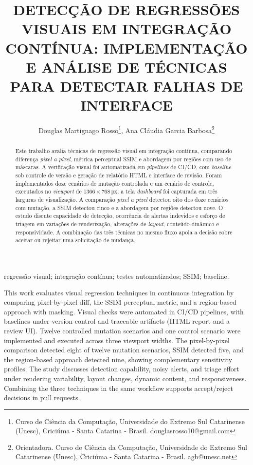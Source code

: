 \documentclass{UNESC}
\title{DETECÇÃO DE REGRESSÕES VISUAIS EM INTEGRAÇÃO CONTÍNUA: IMPLEMENTAÇÃO E ANÁLISE DE TÉCNICAS PARA DETECTAR FALHAS DE INTERFACE}
\author
{
   Douglas Martignago Rosso\footnote{Curso de Ciência da Computação, Universidade do Extremo Sul Catarinense (Unesc), Criciúma - Santa Catarina - Brasil. douglasrosso10@gmail.com},
   Ana Cláudia Garcia Barbosa\footnote{Orientadora. Curso de Ciência da Computação, Universidade do Extremo Sul Catarinense (Unesc), Criciúma - Santa Catarina - Brasil. agb@unesc.net}
}
\begin{document}
\onehalfspacing

\maketitle

\begin{abstract}
Este trabalho avalia técnicas de regressão visual em integração contínua, comparando diferença \emph{pixel a pixel}, métrica perceptual SSIM e abordagem por regiões com uso de máscaras. A verificação visual foi automatizada em \emph{pipelines} de CI/CD, com \emph{baseline} sob controle de versão e geração de relatório HTML e interface de revisão. Foram implementados doze cenários de mutação controlada e um cenário de controle, executados no \emph{viewport} de 1366\,×\,768\,px; a tela \emph{dashboard} foi capturada em três larguras de visualização. A comparação \emph{pixel a pixel} detectou oito dos doze cenários com mutação, a SSIM detectou cinco e a abordagem por regiões detectou nove. O estudo discute capacidade de detecção, ocorrência de alertas indevidos e esforço de triagem em variações de renderização, alterações de \emph{layout}, conteúdo dinâmico e responsividade. A combinação das três técnicas no mesmo fluxo apoia a decisão sobre aceitar ou rejeitar uma solicitação de mudança.
\end{abstract}

\vspace{1pt}

\begin{keywords}
regressão visual; integração contínua; testes automatizados; SSIM; baseline.
\end{keywords}

\vspace{1pt}

\begin{abstractinenglish}
{
This work evaluates visual regression techniques in continuous integration by comparing pixel-by-pixel diff, the SSIM perceptual metric, and a region-based approach with masking. Visual checks were automated in CI/CD pipelines, with baselines under version control and traceable artifacts (HTML report and a review UI). Twelve controlled mutation scenarios and one control scenario were implemented and executed across three viewport widths. The pixel-by-pixel comparison detected eight of twelve mutation scenarios, SSIM detected five, and the region-based approach detected nine, showing complementary sensitivity profiles. The study discusses detection capability, noisy alerts, and triage effort under rendering variability, layout changes, dynamic content, and responsiveness. Combining the three techniques in the same workflow supports accept/reject decisions in pull requests.
}
\end{abstractinenglish}
\end{document}
